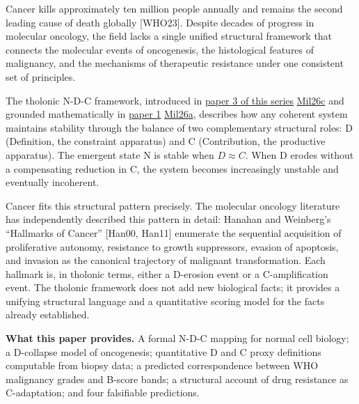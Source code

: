 \documentclass[12pt]{article}
\begin{document}
Cancer kills approximately ten million people annually and remains the
second leading cause of death globally {[}WHO23{]}. Despite decades of
progress in molecular oncology, the field lacks a single unified
structural framework that connects the molecular events of oncogenesis,
the histological features of malignancy, and the mechanisms of
therapeutic resistance under one consistent set of principles.

The tholonic N-D-C framework, introduced in
\href{https://github.com/baardev/truevalue/blob/main/docnav/Research/papers/3_minimal-recursive-triadic-framework/3_minimal-recursive-triadic-framework.pdf}{paper
3 of this series}
\href{https://github.com/baardev/truevalue/blob/main/docnav/Research/papers/3_minimal-recursive-triadic-framework/3_minimal-recursive-triadic-framework.pdf}{Mil26c}
and grounded mathematically in
\href{https://github.com/baardev/truevalue/blob/main/docnav/Research/papers/1_recursive-tholonic-five-constants/1_recursive-tholonic-five-constants.pdf}{paper
1}
\href{https://github.com/baardev/truevalue/blob/main/docnav/Research/papers/1_recursive-tholonic-five-constants/1_recursive-tholonic-five-constants.pdf}{Mil26a},
describes how any coherent system maintains stability through the
balance of two complementary structural roles: D (Definition, the
constraint apparatus) and C (Contribution, the productive apparatus).
The emergent state N is stable when \(D \approx C\). When D erodes
without a compensating reduction in C, the system becomes increasingly
unstable and eventually incoherent.

Cancer fits this structural pattern precisely. The molecular oncology
literature has independently described this pattern in detail: Hanahan
and Weinberg's ``Hallmarks of Cancer'' {[}Han00, Han11{]} enumerate the
sequential acquisition of proliferative autonomy, resistance to growth
suppressors, evasion of apoptosis, and invasion as the canonical
trajectory of malignant transformation. Each hallmark is, in tholonic
terms, either a D-erosion event or a C-amplification event. The tholonic
framework does not add new biological facts; it provides a unifying
structural language and a quantitative scoring model for the facts
already established.

\textbf{What this paper provides.} A formal N-D-C mapping for normal
cell biology; a D-collapse model of oncogenesis; quantitative D and C
proxy definitions computable from biopsy data; a predicted
correspondence between WHO malignancy grades and B-score bands; a
structural account of drug resistance as C-adaptation; and four
falsifiable predictions.
\end{document}
